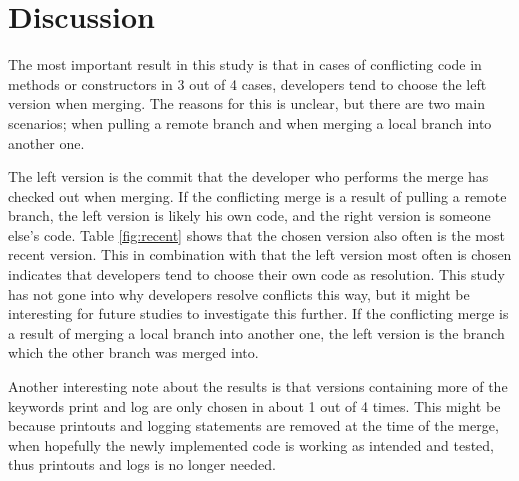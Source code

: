\section{Discussion}
The most important result in this study is that in cases of conflicting code in methods or constructors in 3 out of 4 cases, developers tend to choose the left version when merging. The reasons for this is unclear, but there are two main scenarios; when pulling a remote branch and when merging a local branch into another one.

The left version is the commit that the developer who performs the merge has checked out when merging. If the conflicting merge is a result of pulling a remote branch, the left version is likely his own code, and the right version is someone else’s code. Table \ref{fig:recent} shows that the chosen version also often is the most recent version. This in combination with that the left version most often is chosen indicates that developers tend to choose their own code as resolution. This study has not gone into why developers resolve conflicts this way, but it might be interesting for future studies to investigate this further. If the conflicting merge is a result of merging a local branch into another one, the left version is the branch which the other branch was merged into.

Another interesting note about the results is that versions containing more of the keywords print and log are only chosen in about 1 out of 4 times. This might be because printouts and logging statements are removed at the time of the merge, when hopefully the newly implemented code is working as intended and tested, thus printouts and logs is no longer needed.
